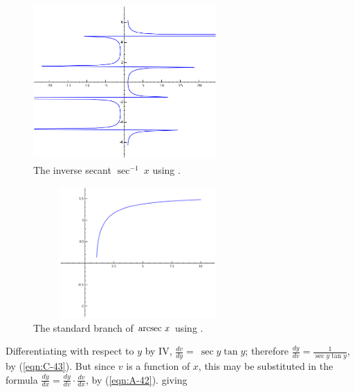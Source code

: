 \begin{figure}[h!]
\begin{minipage}{\textwidth}
\begin{center}
\includegraphics[height=6cm,width=7cm]{arcsec3.eps}
\end{center}
\end{minipage}
\caption{The inverse secant $\sec^{-1}\ x$ using \sage.}
\label{fig:arcsec3}
\end{figure}

\begin{figure}[h!]
\begin{minipage}{\textwidth}
\begin{center}
\includegraphics[height=5cm,width=8cm]{arcsec2.eps}
\end{center}
\end{minipage}
\caption{The standard branch of $\arcsec\ x$ using \sage.}
\label{fig:arcsec2}
\end{figure}

Differentiating with respect to $y$ by IV,
$\frac{dv}{dy} 	=\ \sec y \tan y$;
therefore $\frac{dy}{dv} 	= \frac{1}{\sec y \tan y}$, by (\ref{eqn:C-43}). %
But since $v$ is a function of $x$, this may be substituted in the formula
$\frac{dy}{dx} 	= \frac{dy}{dv} \cdot \frac{dv}{dx}$, by (\ref{eqn:A-42}).%
giving 	

